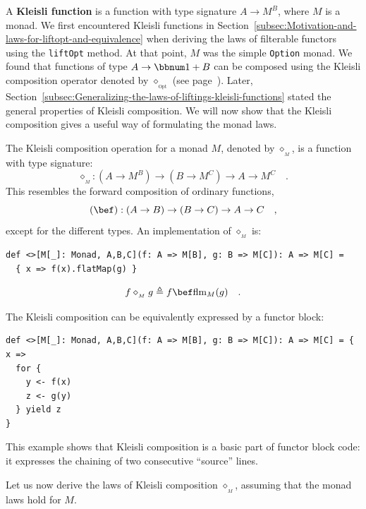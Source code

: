 A \textbf{Kleisli function} is a
function with type signature $A\rightarrow M^{B}$, where $M$ is
a monad. We first encountered Kleisli functions in Section~\ref{subsec:Motivation-and-laws-for-liftopt-and-equivalence}
when deriving the laws of filterable functors using the \lstinline!liftOpt!
method. At that point, $M$ was the simple \lstinline!Option! monad.
We found that functions of type $A\rightarrow\bbnum 1+B$ can be composed
using the Kleisli composition operator denoted by $\diamond_{_{\text{Opt}}}$
(see page~\pageref{kleisli-composition}). Later, Section~\ref{subsec:Generalizing-the-laws-of-liftings-kleisli-functions}
stated the general properties of Kleisli composition. We will now
show that the Kleisli composition gives a useful way of formulating
the monad laws.

The Kleisli composition operation for
a monad $M$, denoted by $\diamond_{_{M}}$, is a function with type
signature:
\[
\diamond_{_{M}}:(A\rightarrow M^{B})\rightarrow(B\rightarrow M^{C})\rightarrow A\rightarrow M^{C}\quad.
\]
This resembles the forward composition of ordinary functions, 
\[
\left(\bef\right):\left(A\rightarrow B\right)\rightarrow\left(B\rightarrow C\right)\rightarrow A\rightarrow C\quad,
\]
except for the different types. An implementation of $\diamond_{_{M}}$
is:
\begin{lstlisting}
def <>[M[_]: Monad, A,B,C](f: A => M[B], g: B => M[C]): A => M[C] =
  { x => f(x).flatMap(g) }
\end{lstlisting}
\begin{equation}
f\diamond_{_{M}}g\triangleq f\bef\text{flm}_{M}(g)\quad.\label{eq:def-of-kleisli-composition-for-monad-via-flatMap}
\end{equation}

The Kleisli composition can be equivalently expressed by a functor
block:

\begin{lstlisting}[mathescape=true]
def <>[M[_]: Monad, A,B,C](f: A => M[B], g: B => M[C]): A => M[C] = { x =>
  for {
    y <- f(x)
    z <- g(y)
  } yield z
}
\end{lstlisting}

This example shows that Kleisli composition is a basic part of functor
block code: it expresses the chaining of two consecutive \textsf{``}source\textsf{''}
lines.

Let us now derive the laws of Kleisli composition $\diamond_{_{M}}$,
assuming that the monad laws hold for $M$. 

